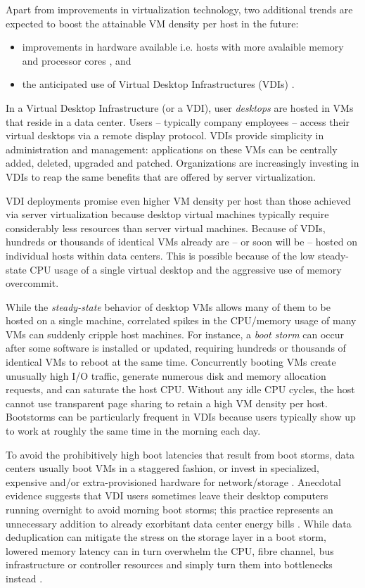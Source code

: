 Apart from improvements in virtualization technology, two additional trends 
are expected to boost the attainable VM density per host in the future:
\begin{itemize}
\item improvements in hardware available i.e. hosts with
more avalaible memory and processor cores \cite{hansen2010lithium},
and 
\item the anticipated use of Virtual Desktop Infrastructures (VDIs) \cite{vmwarevdi}.
\end{itemize}

In a Virtual Desktop Infrastructure (or a VDI), user {\em desktops} are hosted in
VMs that reside in a data center. 
Users -- typically company employees -- access their virtual desktops via a remote display protocol. 
VDIs provide simplicity in administration and management: applications on 
these VMs can be centrally added, deleted, upgraded and patched. 
Organizations are increasingly investing in VDIs to reap the same benefits
that are offered by server virtualization.

VDI deployments promise even higher VM density per
host than those achieved via server virtualization
because desktop virtual machines typically require
considerably less resources than server virtual machines.
Because of VDIs, hundreds or thousands of identical VMs already are -- or soon
will be -- hosted on individual hosts within data centers.
This is possible because of the low steady-state CPU
usage of a single virtual desktop and the aggressive
use of memory overcommit.

While the {\em steady-state} behavior of desktop VMs
allows many of them to be hosted on a single machine,
correlated spikes in the CPU/memory usage of many VMs can suddenly 
cripple host machines. For instance, a \emph{boot storm} \cite{hansen2010lithium, 
liao2011vmstore, meng2010tide, rajan2010vdc, vaghani2010virtual}
can occur after some software is installed or updated, requiring hundreds 
or thousands of identical VMs to reboot at the same time.
Concurrently booting VMs create unusually high I/O traffic,
generate numerous disk and memory allocation requests,
and can saturate the host CPU. Without any idle
CPU cycles, the host cannot use transparent page sharing
to retain a high VM density per host. Bootstorms can be
particularly frequent in VDIs because users typically show up to
work at roughly the same time in the morning each day. 

To avoid the prohibitively high boot latencies that  
result from boot storms, data centers usually
boot VMs in a staggered fashion, or invest in specialized,
expensive and/or extra-provisioned hardware for network/storage \cite{highperfnas, liao2011vmstore}.
Anecdotal evidence suggests that VDI users sometimes leave their desktop computers running
overnight to avoid morning boot storms; this practice
represents an unnecessary addition to already exorbitant
data center energy bills \cite{qureshi2009bills}. 
While data deduplication \cite{clements2009deduplication}
can mitigate the stress on the storage layer in
a boot storm, lowered memory latency can in turn overwhelm the CPU, 
fibre channel, bus infrastructure or controller resources 
and simply turn them into bottlenecks instead \cite{netappstorm}. 

